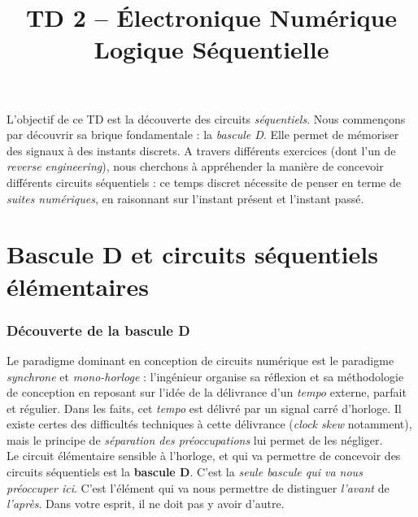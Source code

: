 \documentclass[a4paper,11pt]{article}
\title{\textcolor{primary}{\Huge\bfseries TD 2 -- Électronique Numérique}\\[0.5em] \Large Logique Séquentielle}
\author{}
\date{}
\begin{document}
\maketitle
\thispagestyle{fancy}   %
\vspace{-2em}

\begin{notebox}

    L'objectif de ce TD est la découverte des circuits \textit{séquentiels}. Nous commençons par découvrir sa brique fondamentale : la \textit{bascule D}. Elle permet de mémoriser des signaux à des instants discrets. A travers différents exercices (dont l'un de \textit{reverse engineering}), nous cherchons à appréhender la manière de concevoir différents circuits séquentiels : ce temps discret nécessite de penser en terme de \textit{suites numériques}, en raisonnant sur l'instant présent et l'instant passé.

\end{notebox}

\vspace{1em}

\part{Bascule D et circuits séquentiels élémentaires}

\section{Découverte de la bascule D}

Le paradigme dominant en conception de circuits numérique est le paradigme \textit{synchrone} et \textit{mono-horloge} : l'ingénieur organise sa réflexion et sa méthodologie de conception en reposant sur l'idée de la délivrance d'un \textit{tempo} externe, parfait et régulier. Dans les faits, cet \textit{tempo} est délivré par un signal carré d'{horloge}. Il existe certes des difficultés techniques à cette délivrance (\textit{clock skew} notamment), mais le principe de \textit{séparation des préoccupations} lui permet de les négliger.\\

Le circuit élémentaire sensible à l'horloge, et qui va permettre de concevoir des circuits séquentiels est la \textbf{bascule D}. C'est la \textit{seule bascule qui va nous préoccuper ici}. C'est l'élément qui va nous permettre de distinguer \textit{l'avant} de \textit{l'après}. Dans votre esprit, il ne doit pas y avoir d'autre.\\
\end{document}
